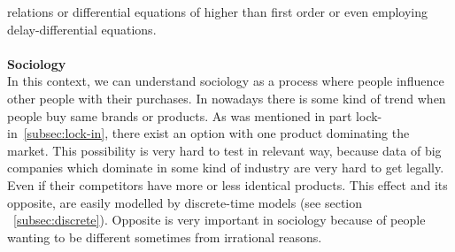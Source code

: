 relations or differential equations of higher than first order or even employing delay-differential equations.\\
\\
\textbf{Sociology} \label{subsec:sociology}\\
In this context, we can understand sociology as a process where people influence other people with their purchases.
In nowadays there is some kind of trend when people buy same brands or products.
As was mentioned in part lock-in~\ref{subsec:lock-in},
there exist an option with one product dominating the market.
This possibility is very hard to test in relevant way, because data of big  companies which dominate in some kind of industry are very hard to get legally.
Even if their competitors have more or less identical products.
This effect and its opposite, are easily modelled by discrete-time models (see section ~\ref{subsec:discrete}).
Opposite is very important in sociology because of people wanting to be different sometimes from irrational reasons.

